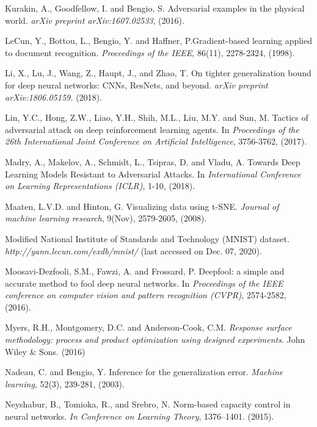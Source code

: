 \documentclass[12pt]{article}
\begin{document}
\begin{thebibliography}{}
Kurakin, A., Goodfellow, I. and Bengio, S. Adversarial examples in the
physical world. {\it arXiv preprint arXiv:1607.02533}, (2016).
  
LeCun, Y., Bottou, L., Bengio, Y. and Haffner, P.Gradient-based
learning applied to document recognition. {\it Proceedings of the IEEE},
86(11), 2278-2324, (1998).

  Li, X., Lu, J., Wang, Z., Haupt, J., and Zhao, T.  On tighter
  generalization bound for deep neural networks: CNNs, ResNets, and
  beyond. {\it arXiv preprint arXiv:1806.05159.} (2018).

  Lin, Y.C., Hong, Z.W., Liao, Y.H., Shih, M.L., Liu, M.Y. and Sun,
  M. Tactics of adversarial attack on deep
  reinforcement learning agents. In {\it Proceedings of the 26th
  International Joint Conference on Artificial Intelligence}, 
  3756-3762, (2017). 

Madry, A., Makelov, A., Schmidt, L., Tsipras, D. and Vladu, A. Towards
Deep Learning Models Resistant to Adversarial 
Attacks. In {\it International Conference on Learning
Representations (ICLR)}, 1-10, (2018).   

Maaten, L.V.D. and Hinton, G. Visualizing data using
t-SNE. {\it Journal of machine learning research}, 9(Nov), 2579-2605,
(2008).  

Modified National Institute of Standards and Technology (MNIST)
dataset. {\it http://yann.lecun.com/exdb/mnist/} (last accessed on
Dec. 07, 2020).   

Moosavi-Dezfooli, S.M., Fawzi, A. and Frossard, P. Deepfool: a
simple and accurate method to fool deep neural networks. In
{\it Proceedings of the IEEE conference on computer vision and pattern
recognition (CVPR)}, 2574-2582, (2016).   

 Myers, R.H., Montgomery, D.C. and Anderson-Cook, C.M. {\it Response
 surface methodology: process and product optimization using designed
 experiments}. John Wiley \& Sons. (2016)  

  Nadeau, C. and Bengio, Y.  Inference for the generalization
  error. {\it Machine learning}, 52(3), 239-281,  (2003).

Neyshabur, B., Tomioka, R., and Srebro, N.  Norm-based capacity
control in neural networks. {\it In Conference on Learning Theory},
1376–1401. (2015).  


\end{thebibliography}
\end{document}
